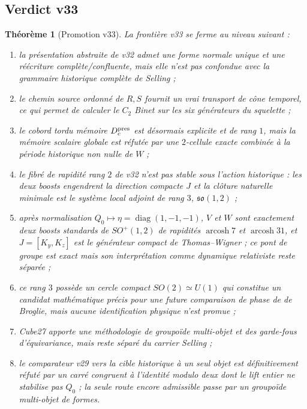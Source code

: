 \documentclass[11pt,a4paper]{article}
\newtheorem{theorem}{Théorème}[section]
\begin{document}
\subsection{Verdict v33}

\begin{theorem}[Promotion v33]\label{thm:v33-verdict}
La frontière v33 se ferme au niveau suivant :
\begin{enumerate}[label=\textup{(\roman*)}]
\item la présentation abstraite de v32 admet une forme normale unique et une réécriture complète/confluente, mais elle n'est pas confondue avec la grammaire historique complète de Selling ;
\item le chemin source ordonné de $R,S$ fournit un vrai transport de cône temporel, ce qui permet de calculer le $C_2$ Binet sur les six générateurs du squelette ;
\item le cobord tordu mémoire $D_c^{\rm pres}$ est désormais explicite et de rang $1$, mais la mémoire scalaire globale est réfutée par une $2$-cellule exacte combinée à la période historique non nulle de $W$ ;
\item le fibré de rapidité rang $2$ de v32 n'est pas stable sous l'action historique : les deux boosts engendrent la direction compacte $J$ et la clôture naturelle minimale est le système local adjoint de rang $3$, $\mathfrak{so}(1,2)$ ;
\item après normalisation $Q_0\mapsto\eta=\operatorname{diag}(1,-1,-1)$, $V$ et $W$ sont exactement deux boosts standards de $SO^+(1,2)$ de rapidités $\operatorname{arcosh}7$ et $\operatorname{arcosh}31$, et $J=[K_y,K_z]$ est le générateur compact de Thomas--Wigner ; ce pont de groupe est exact mais son interprétation comme dynamique relativiste reste séparée ;
\item ce rang $3$ possède un cercle compact $SO(2)\simeq U(1)$ qui constitue un candidat mathématique précis pour une future comparaison de phase de de Broglie, mais aucune identification physique n'est promue ;
\item Cube27 apporte une méthodologie de groupoïde multi-objet et des garde-fous d'équivariance, mais reste séparé du carrier Selling ;
\item le comparateur v29 vers la cible historique à un seul objet est définitivement réfuté par un carré congruent à l'identité modulo deux dont le lift entier ne stabilise pas $Q_0$ ; la seule route encore admissible passe par un groupoïde multi-objet de formes.
\end{enumerate}
\end{theorem}
\end{document}

